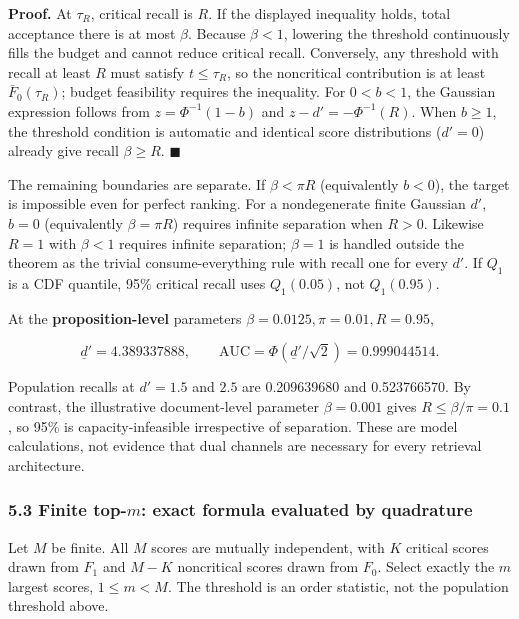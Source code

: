 \documentclass[
  11pt]{article}
\begin{document}
\textbf{Proof.} At \(\tau_R\), critical recall is \(R\). If the
displayed inequality holds, total acceptance there is at most \(\beta\).
Because \(\beta<1\), lowering the threshold continuously fills the
budget and cannot reduce critical recall. Conversely, any threshold with
recall at least \(R\) must satisfy \(t\le\tau_R\), so the noncritical
contribution is at least \(\bar F_0(\tau_R)\); budget feasibility
requires the inequality. For \(0<b<1\), the Gaussian expression follows
from \(z=\Phi^{-1}(1-b)\) and \(z-d'=-\Phi^{-1}(R)\). When \(b\ge1\),
the threshold condition is automatic and identical score distributions
(\(d'=0\)) already give recall \(\beta\ge R\). \(\blacksquare\)

The remaining boundaries are separate. If \(\beta<\pi R\) (equivalently
\(b<0\)), the target is impossible even for perfect ranking. For a
nondegenerate finite Gaussian \(d'\), \(b=0\) (equivalently
\(\beta=\pi R\)) requires infinite separation when \(R>0\). Likewise
\(R=1\) with \(\beta<1\) requires infinite separation; \(\beta=1\) is
handled outside the theorem as the trivial consume-everything rule with
recall one for every \(d'\). If \(Q_1\) is a CDF quantile, 95\% critical
recall uses \(Q_1(0.05)\), not \(Q_1(0.95)\).

At the \textbf{proposition-level} parameters
\(\beta=0.0125,\pi=0.01,R=0.95\),

\[\underline d'=4.389337888,\qquad \mathrm{AUC}=\Phi(\underline d'/\sqrt2)=0.999044514.\]

Population recalls at \(d'=1.5\) and \(2.5\) are 0.209639680 and
0.523766570. By contrast, the illustrative document-level parameter
\(\beta=0.001\) gives \(R\le\beta/\pi=0.1\), so 95\% is
capacity-infeasible irrespective of separation. These are model
calculations, not evidence that dual channels are necessary for every
retrieval architecture.

\subsubsection{\texorpdfstring{5.3 Finite top-\(m\): exact formula
evaluated by
quadrature}{5.3 Finite top-m: exact formula evaluated by quadrature}}\label{finite-top-m-exact-formula-evaluated-by-quadrature}

Let \(M\) be finite. All \(M\) scores are mutually independent, with
\(K\) critical scores drawn from \(F_1\) and \(M-K\) noncritical scores
drawn from \(F_0\). Select exactly the \(m\) largest scores,
\(1\le m<M\). The threshold is an order statistic, not the population
threshold above.
\end{document}
